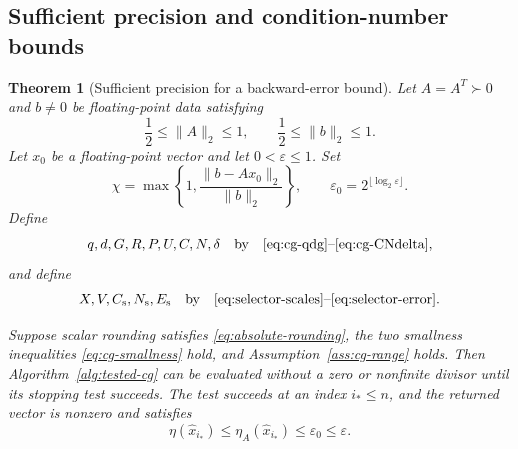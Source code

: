 \documentclass[11pt]{article}
\newtheorem{theorem}{Theorem}
\theoremstyle{definition}
\begin{document}
\subsection{Sufficient precision and condition-number bounds}

\begin{theorem}[Sufficient precision for a backward-error bound]
\label{thm:cg-bit-bound}
Let $A=A^T\succ0$ and $b\ne0$ be floating-point data satisfying
\[
 \frac12\le\|A\|_2\le1,
 \qquad
 \frac12\le\|b\|_2\le1.
\]
Let $x_0$ be a floating-point vector and let $0<\varepsilon\le1$.  Set
\[
 \chi=\max\left\{1,\frac{\|b-Ax_0\|_2}{\|b\|_2}\right\},
 \qquad
 \varepsilon_0=2^{\lfloor\log_2\varepsilon\rfloor}.
\]
Define
\[
 q,d,G,R,P,U,C,N,\delta
 \quad\hbox{by}\quad
 \eqref{eq:cg-qdg}\text{--}\eqref{eq:cg-CNdelta},
\]
and define
\[
 X,V,C_{\rm s},N_{\rm s},E_{\rm s}
 \quad\hbox{by}\quad
 \eqref{eq:selector-scales}\text{--}\eqref{eq:selector-error}.
\]

Suppose scalar rounding satisfies \eqref{eq:absolute-rounding}, the two
smallness inequalities \eqref{eq:cg-smallness} hold, and
Assumption~\ref{ass:cg-range} holds.  Then Algorithm~\ref{alg:tested-cg} can be evaluated
without a zero or nonfinite divisor until its stopping test succeeds.  The
test succeeds at an index $i_*\le n$, and the returned vector is nonzero and
satisfies
\begin{equation}
 \eta(\widehat x_{i_*})
 \le\eta_A(\widehat x_{i_*})
 \le\varepsilon_0\le\varepsilon.
 \label{eq:cg-eta-result}
\end{equation}
\end{theorem}
\end{document}
